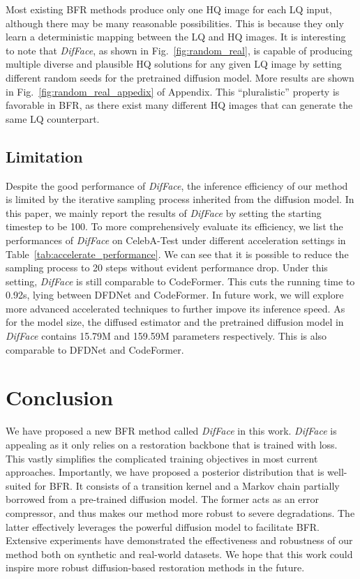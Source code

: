 \documentclass[10pt,twocolumn,letterpaper]{article}
\begin{document}
Most existing BFR methods produce only one HQ image for each LQ input, although there may be many reasonable possibilities. This is because they only learn  a deterministic mapping between the LQ and HQ images. It is interesting to note that \textit{DifFace}, as shown in Fig.~\ref{fig:random_real}, is capable of producing multiple diverse and plausible HQ solutions for any given LQ image by setting different random seeds for the pretrained diffusion model. More results are shown in Fig.~\ref{fig:random_real_appedix} of Appendix. This ``pluralistic'' property is favorable in BFR, as there exist many different HQ images that can generate the same LQ counterpart.

\subsection{Limitation}
Despite the good performance of \textit{DifFace}, the inference efficiency of our method is limited by the iterative sampling process inherited from the diffusion model. In this paper, we mainly report the results of \textit{DifFace} by setting the starting timestep to be 100. To more comprehensively evaluate its efficiency, we list the performances of \textit{DifFace} on CelebA-Test under different acceleration settings in Table~\ref{tab:accelerate_performance}. We can see that it is possible to reduce the sampling process to 20 steps without evident performance drop. Under this setting, \textit{DifFace} is still comparable to CodeFormer. This cuts the running time to 0.92s, lying between DFDNet and CodeFormer. In future work, we will explore more advanced accelerated techniques to further impove its inference speed. As for the model size, the diffused estimator and the pretrained diffusion model in \textit{DifFace} contains 15.79M and 159.59M parameters respectively. This is also comparable to DFDNet and CodeFormer.



\section{Conclusion}
We have proposed a new BFR method called \textit{DifFace} in this work. \textit{DifFace} is appealing as it only relies on a restoration backbone that is trained with  loss. This vastly simplifies the complicated training objectives in most current approaches. Importantly, we have proposed a posterior distribution that is well-suited for BFR. It consists of a transition kernel and a Markov chain partially borrowed from a pre-trained diffusion model. The former acts as an error compressor, and thus makes our method more robust to severe degradations. The latter effectively leverages the powerful diffusion model to facilitate BFR. Extensive experiments have demonstrated the effectiveness and robustness of our method both on synthetic and real-world datasets. We hope that this work could inspire more robust diffusion-based restoration methods in the future.
\end{document}
